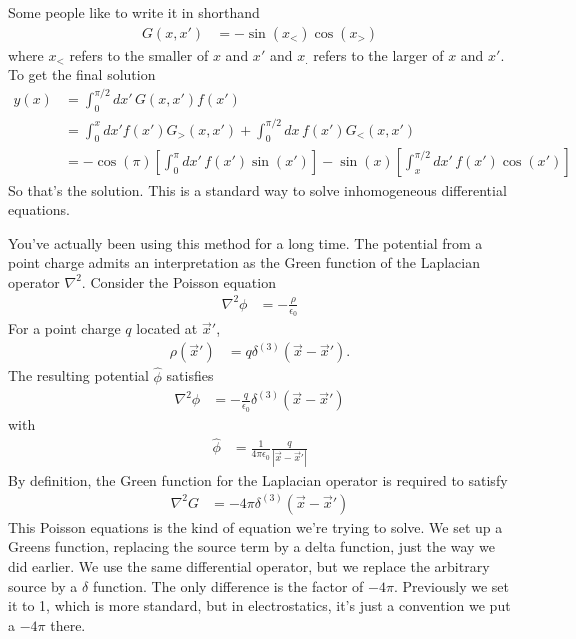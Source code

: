 Some people like to write it in shorthand
\begin{align}
    G\left( x, x' \right)
    &=
    -\sin\left( x_{<} \right)\cos\left( x_{>} \right)
\end{align}
where $x_{<}$ refers to the smaller of $x$ and $x'$
and $x_{.}$ refers to the larger of $x$ and $x'$.
To get the final solution
\begin{align}
    y(x) &=
    \int_{0}^{\pi/2}dx'\,
    G\left( x, x' \right)
    f\left( x' \right)\\
    &=
    \int_{0}^{x}
    dx'
    f\left( x' \right)
    G_{>}\left( x, x' \right)
    +
    \int_{0}^{\pi/2}dx\,
    f\left( x' \right)
    G_{<}\left( x, x' \right)\\
    &= -\cos(\pi)\left[ 
    \int_{0}^{\pi}dx'\,
    f\left( x' \right)
    \sin\left( x' \right)
    \right]
    -
    \sin\left( x \right)
    \left[ 
    \int_{x}^{\pi/2}dx'\,
    f\left( x' \right)
    \cos\left( x' \right)
    \right]
\end{align}
So that's the solution.
This is a standard way to solve inhomogeneous differential equations.

You've actually been using this method for a long time.
The potential from a point charge admits an interpretation as the Green function
of the Laplacian operator $\nabla^2$.
Consider the Poisson equation
\begin{align}
    \nabla^2\phi &=
    -\frac{\rho}{\epsilon_0}
\end{align}
For a point charge $q$ located at $\vec{x}'$,
\begin{align}
    \rho\left( \vec{x}' \right)
    &=
    q\delta^{(3)}\left( \vec{x} - \vec{x}' \right).
\end{align}
The resulting potential $\hat{\phi}$ satisfies
\begin{align}
    \nabla^2\hat{\phi}
    &=
    -\frac{q}{\epsilon_0}
    \delta^{(3)}\left( \vec{x} - \vec{x}' \right)
\end{align}
with
\begin{align}
    \hat{\phi}
    &=
    \frac{1}{4\pi\epsilon_0}
    \frac{q}{\left| \vec{x} - \vec{x}'\right|}
\end{align}
By definition,
the Green function for the Laplacian operator is required to satisfy
\begin{align}
    \nabla^2 G
    &=
    -4\pi \delta^{(3)}\left( \vec{x} - \vec{x}' \right)
\end{align}
This Poisson equations is the kind of equation we're trying to solve.
We set up a Greens function,
replacing the source term by a delta function,
just the way we did earlier.
We use the same differential operator,
but we replace the arbitrary source by a $\delta$ function.
The only difference is the factor of $-4\pi$.
Previously we set it to 1,
which is more standard,
but in electrostatics,
it's just a convention we put a $-4\pi$ there.

